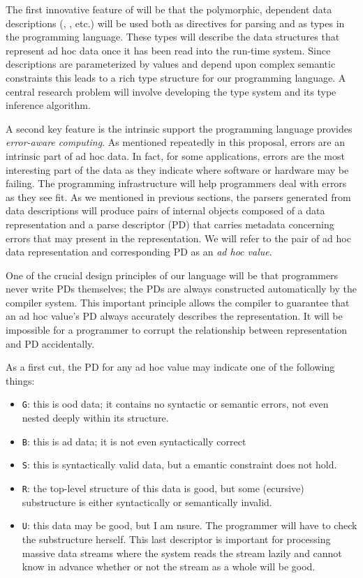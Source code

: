\documentclass[11pt]{article}
\begin{document}
The first innovative feature of \datatype{} will be
that the polymorphic, dependent
data descriptions (, , etc.)
will be used both as directives for parsing and
as types in the programming language.  These
types will describe the data structures that represent
ad hoc data once it has been
read into the run-time system.  Since \datatype{} descriptions
are parameterized by values and depend upon complex semantic constraints
this leads to a rich type structure for our programming language.
A central research problem will involve developing the type system
and its type inference algorithm.

A second key feature is the intrinsic support the programming language provides
{\em error-aware computing}.  As mentioned repeatedly in this proposal,
errors are an intrinsic part of ad hoc data.  In fact, for some 
applications, errors are the most interesting part of the data 
as they indicate where software or
hardware may be failing.  The \datatype{} programming infrastructure
will help programmers deal with errors as they see fit.
As we mentioned in previous
sections, the parsers generated from \datatype{} data descriptions
will produce pairs of internal objects composed of
a data representation and a parse descriptor (PD)
that carries metadata concerning errors that may present in the 
representation.
We will refer to the pair of ad hoc data representation and corresponding PD
as an {\em ad hoc value}.

One of the crucial design principles of our language will be
that programmers never write PDs themselves; the
PDs are always constructed automatically by the
compiler system.  This important principle allows the compiler
to guarantee that an ad hoc value's PD always accurately 
describes the representation.
It will be impossible for a programmer to corrupt the relationship
between representation and PD accidentally.  

As a first cut, the PD for any ad hoc
value may indicate one of the following things:
\begin{itemize}
\item {\tt G}: this is ood data; it contains no syntactic or 
semantic errors, not even nested deeply within its structure.
\item {\tt B}: this is ad data; it is not even syntactically correct
\item {\tt S}: this is syntactically valid data, but a emantic 
constraint does not hold.
\item {\tt R}: the top-level structure of this data is good, but some
(ecursive) substructure is either syntactically or semantically invalid.
\item {\tt U}: this data may be good, but I am nsure.  The programmer 
will have to check the substructure herself.  This last descriptor
is important for processing massive data streams where the system reads the
stream lazily and cannot know in advance whether or not the stream
as a whole will be good.
\end{itemize}
\end{document}
